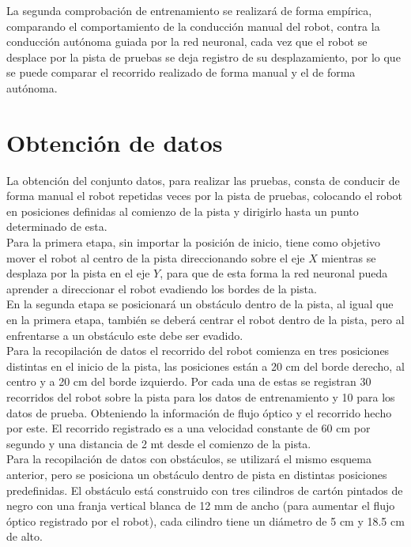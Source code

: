 \documentclass{iccmemoria}
\begin{document}
La segunda comprobación de entrenamiento se realizará de forma empírica, comparando el comportamiento de la conducción manual del robot, contra la conducción autónoma guiada por la red neuronal, cada vez que el robot se desplace por la pista de pruebas se deja registro de su desplazamiento, por lo que se puede comparar el recorrido realizado de forma manual y el de forma autónoma.\\

 
\section{Obtención de datos}
 
La obtención del conjunto datos, para realizar las pruebas, consta de conducir de forma manual el robot repetidas veces por la pista de pruebas, colocando el robot en posiciones definidas al comienzo de la pista y dirigirlo hasta un punto determinado de esta.\\
 
Para la primera etapa, sin importar la posición de inicio, tiene como objetivo mover el robot al centro de la pista direccionando sobre el eje $X$ mientras se desplaza por la pista en el eje $Y$, para que de esta forma la red neuronal pueda aprender a direccionar el robot evadiendo los bordes de la pista.\\
 
En la segunda etapa se posicionará un obstáculo dentro de la pista, al igual que en la primera etapa, también se deberá centrar el robot dentro de la pista, pero al enfrentarse a un obstáculo este debe ser evadido.\\

Para la recopilación de datos el recorrido del robot comienza en tres posiciones distintas en el inicio de la pista, las posiciones están a 20 cm del borde derecho, al centro y a 20 cm del borde izquierdo. Por cada una de estas se registran 30 recorridos del robot sobre la pista para los datos de entrenamiento y 10 para los datos de prueba. Obteniendo la información de flujo óptico y el recorrido hecho por este. El recorrido registrado es a una velocidad constante de 60 cm por segundo y una distancia de 2 mt desde el comienzo de la pista.\\
 
Para la recopilación de datos con obstáculos, se utilizará el mismo esquema anterior, pero se posiciona un obstáculo dentro de pista en distintas posiciones predefinidas. El obstáculo está construido con tres cilindros de cartón pintados de negro con una franja vertical blanca de 12 mm de ancho (para aumentar el flujo óptico registrado por el robot), cada cilindro tiene un diámetro de 5 cm y 18.5 cm de alto.\\
\end{document}
